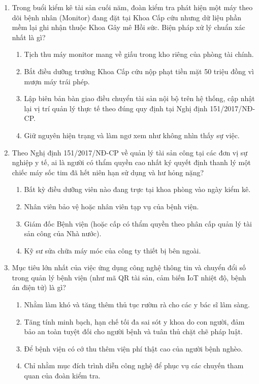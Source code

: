 \documentclass[12pt,a4paper]{article}
\begin{document}
\begin{enumerate}[label=\textbf{Câu \arabic*:}, leftmargin=*]
\item Trong buổi kiểm kê tài sản cuối năm, đoàn kiểm tra phát hiện một máy theo dõi bệnh nhân (Monitor) đang đặt tại Khoa Cấp cứu nhưng dữ liệu phần mềm lại ghi nhận thuộc Khoa Gây mê Hồi sức. Biện pháp xử lý chuẩn xác nhất là gì?
\begin{enumerate}[label=\textbf{\Alph*.}]
    \item Tịch thu máy monitor mang về giấu trong kho riêng của phòng tài chính.
    \item Bắt điều dưỡng trưởng Khoa Cấp cứu nộp phạt tiền mặt 50 triệu đồng vì mượn máy trái phép.
    \item Lập biên bản bàn giao điều chuyển tài sản nội bộ trên hệ thống, cập nhật lại vị trí quản lý thực tế theo đúng quy định tại Nghị định 151/2017/NĐ-CP.
    \item Giữ nguyên hiện trạng và làm ngơ xem như không nhìn thấy sự việc.
\end{enumerate}

\item Theo Nghị định 151/2017/NĐ-CP về quản lý tài sản công tại các đơn vị sự nghiệp y tế, ai là người có thẩm quyền cao nhất ký quyết định thanh lý một chiếc máy sốc tim đã hết niên hạn sử dụng và hư hỏng nặng?
\begin{enumerate}[label=\textbf{\Alph*.}]
    \item Bất kỳ điều dưỡng viên nào đang trực tại khoa phòng vào ngày kiểm kê.
    \item Nhân viên bảo vệ hoặc nhân viên tạp vụ của bệnh viện.
    \item Giám đốc Bệnh viện (hoặc cấp có thẩm quyền theo phân cấp quản lý tài sản công của Nhà nước).
    \item Kỹ sư sửa chữa máy móc của công ty thiết bị bên ngoài.
\end{enumerate}

\item Mục tiêu lớn nhất của việc ứng dụng công nghệ thông tin và chuyển đổi số trong quản lý bệnh viện (như mã QR tài sản, cảm biến IoT nhiệt độ, bệnh án điện tử) là gì?
\begin{enumerate}[label=\textbf{\Alph*.}]
    \item Nhằm làm khó và tăng thêm thủ tục rườm rà cho các y bác sĩ lâm sàng.
    \item Tăng tính minh bạch, hạn chế tối đa sai sót y khoa do con người, đảm bảo an toàn tuyệt đối cho người bệnh và tuân thủ chặt chẽ pháp luật.
    \item Để bệnh viện có cớ thu thêm viện phí thật cao của người bệnh nghèo.
    \item Chỉ nhằm mục đích trình diễn công nghệ để phục vụ các chuyến tham quan của đoàn kiểm tra.
\end{enumerate}

\end{enumerate}
\end{document}
